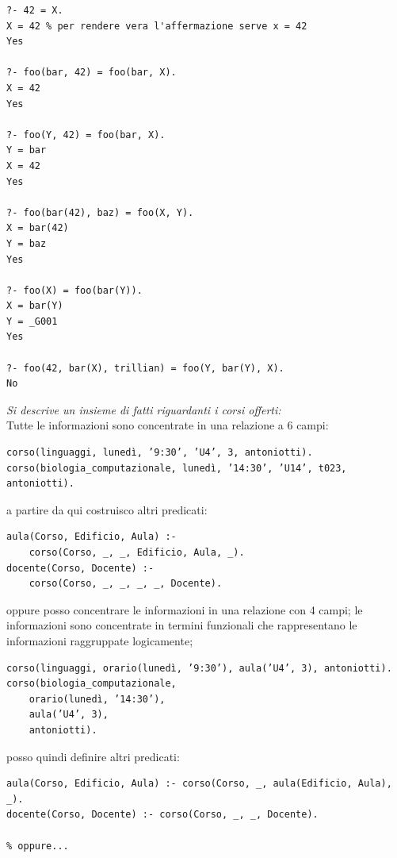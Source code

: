 \documentclass[a4paper,12pt, oneside]{book}
\begin{document}
\begin{itemize}
\begin{verbatim}
?- 42 = X.
X = 42 % per rendere vera l'affermazione serve x = 42
Yes

?- foo(bar, 42) = foo(bar, X).
X = 42
Yes

?- foo(Y, 42) = foo(bar, X).
Y = bar
X = 42
Yes

?- foo(bar(42), baz) = foo(X, Y).
X = bar(42)
Y = baz
Yes

?- foo(X) = foo(bar(Y)).
X = bar(Y)
Y = _G001
Yes

?- foo(42, bar(X), trillian) = foo(Y, bar(Y), X).
No
\end{verbatim}
\begin{esempio}
\textit{Si descrive un insieme di fatti riguardanti i corsi offerti:}\\
Tutte le informazioni sono concentrate in una relazione a 6 campi:
\begin{verbatim}
corso(linguaggi, lunedì, ’9:30’, ’U4’, 3, antoniotti).
corso(biologia_computazionale, lunedì, ’14:30’, ’U14’, t023, antoniotti).
\end{verbatim}
a partire da qui costruisco altri predicati:
\begin{verbatim}
aula(Corso, Edificio, Aula) :-
	corso(Corso, _, _, Edificio, Aula, _).
docente(Corso, Docente) :-
	corso(Corso, _, _, _, _, Docente).
\end{verbatim}
oppure posso concentrare le informazioni in una relazione con 4 campi; le informazioni sono concentrate in termini funzionali che rappresentano le informazioni raggruppate logicamente;
\begin{verbatim}
corso(linguaggi, orario(lunedì, ’9:30’), aula(’U4’, 3), antoniotti).
corso(biologia_computazionale,
	orario(lunedì, ’14:30’),
	aula(’U4’, 3),
	antoniotti).
\end{verbatim}
posso quindi definire altri predicati:
\begin{verbatim}
aula(Corso, Edificio, Aula) :- corso(Corso, _, aula(Edificio, Aula), _).
docente(Corso, Docente) :- corso(Corso, _, _, Docente).

% oppure...


\end{verbatim}
\end{esempio}
\end{itemize}
\end{document}
